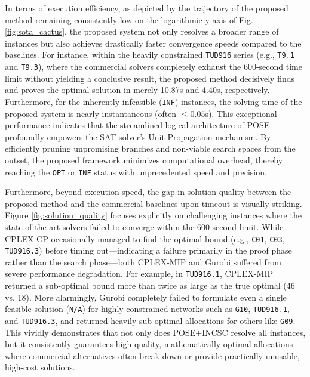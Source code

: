 \documentclass[letterpaper,journal]{IEEEtran}
\begin{document}
In terms of execution efficiency, as depicted by the trajectory of the proposed method remaining consistently low on the logarithmic y-axis of Fig. \ref{fig:sota_cactus}, the proposed system not only resolves a broader range of instances but also achieves drastically faster convergence speeds compared to the baselines. For instance, within the heavily constrained \texttt{TUD916} series (e.g., \texttt{T9.1} and \texttt{T9.3}), where the commercial solvers completely exhaust the 600-second time limit without yielding a conclusive result, the proposed method decisively finds and proves the optimal solution in merely 10.87s and 4.40s, respectively. Furthermore, for the inherently infeasible (\texttt{INF}) instances, the solving time of the proposed system is nearly instantaneous (often $\le 0.05$s). This exceptional performance indicates that the streamlined logical architecture of POSE profoundly empowers the SAT solver's Unit Propagation mechanism. By efficiently pruning unpromising branches and non-viable search spaces from the outset, the proposed framework minimizes computational overhead, thereby reaching the \texttt{OPT} or \texttt{INF} status with unprecedented speed and precision.


Furthermore, beyond execution speed, the gap in solution quality between the proposed method and the commercial baselines upon timeout is visually striking. Figure \ref{fig:solution_quality} focuses explicitly on challenging instances where the state-of-the-art solvers failed to converge within the 600-second limit. While CPLEX-CP occasionally managed to find the optimal bound (e.g., \texttt{C01}, \texttt{C03}, \texttt{TUD916.3}) before timing out—indicating a failure primarily in the proof phase rather than the search phase—both CPLEX-MIP and Gurobi suffered from severe performance degradation. For example, in \texttt{TUD916.1}, CPLEX-MIP returned a sub-optimal bound more than twice as large as the true optimal (46 vs. 18). More alarmingly, Gurobi completely failed to formulate even a single feasible solution (\texttt{N/A}) for highly constrained networks such as \texttt{G10}, \texttt{TUD916.1}, and \texttt{TUD916.3}, and returned heavily sub-optimal allocations for others like \texttt{G09}. This vividly demonstrates that not only does POSE+INCSC resolve all instances, but it consistently guarantees high-quality, mathematically optimal allocations where commercial alternatives often break down or provide practically unusable, high-cost solutions.

\end{document}
